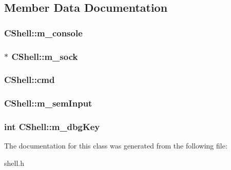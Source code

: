 \subsection{Member Data Documentation}
\hypertarget{class_c_shell_ac555f42f70f60653dbd5e0c8ec9c4dcf}{
\subsubsection[{m\-\_\-console}]{ C\-Shell\-::m\-\_\-console}}\label{class_c_shell_ac555f42f70f60653dbd5e0c8ec9c4dcf}
\hypertarget{class_c_shell_ab0eaa18213db8965c68f978538050162}{
\subsubsection[{m\-\_\-sock}]{$\ast$ C\-Shell\-::m\-\_\-sock\hspace{0.3cm}{\ttfamily [protected]}}}\label{class_c_shell_ab0eaa18213db8965c68f978538050162}
\hypertarget{class_c_shell_aa5ef2d56e802b9925cf0ae7d36741bda}{
\subsubsection[{cmd}]{ C\-Shell\-::cmd\hspace{0.3cm}{\ttfamily [protected]}}}\label{class_c_shell_aa5ef2d56e802b9925cf0ae7d36741bda}
\hypertarget{class_c_shell_aa81828c40c17f38821ec395aaf38ee98}{
\subsubsection[{m\-\_\-sem\-Input}]{ C\-Shell\-::m\-\_\-sem\-Input\hspace{0.3cm}{\ttfamily [protected]}}}\label{class_c_shell_aa81828c40c17f38821ec395aaf38ee98}
\hypertarget{class_c_shell_ab2b6ca1616128e6a8a05c8c235c7b011}{
\subsubsection[{m\-\_\-dbg\-Key}]{\setlength{\rightskip}{0pt plus 5cm}int C\-Shell\-::m\-\_\-dbg\-Key\hspace{0.3cm}{\ttfamily [protected]}}}\label{class_c_shell_ab2b6ca1616128e6a8a05c8c235c7b011}


The documentation for this class was generated from the following file\-:\begin{DoxyCompactItemize}
\item 
shell.\-h\end{DoxyCompactItemize}
